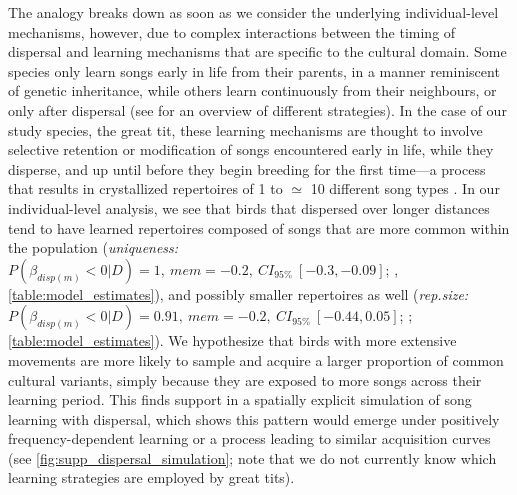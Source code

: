 \documentclass[9pt, onecolumn, twoside, lineno]{gsajnl}
\begin{document}
The analogy breaks down as soon as we consider the underlying individual-level mechanisms, however, due to complex interactions between the timing of dispersal and learning mechanisms that are specific to the cultural domain. Some species only learn songs early in life from their parents, in a manner reminiscent of genetic inheritance, while others learn continuously from their neighbours, or only after dispersal (see \autocite{searcy2021} for an overview of different strategies). In the case of our study species, the great tit, these learning mechanisms are thought to involve selective retention or modification of songs encountered early in life, while they disperse, and up until before they begin breeding for the first time---a process that results in crystallized repertoires of 1 to $\simeq$ 10 different song types \autocite{mcgregor1982b,rivera-gutierrez2011,merinorecalde2023a}. In our individual-level analysis, we see that birds that dispersed over longer distances tend to have learned repertoires composed of songs that are more common within the population (\textit{uniqueness:} $P(\beta_{disp (m)} < 0 | D) = 1,~mem = -0.2,~CI_{95\%}~[-0.3, -0.09]$; , \autoref{table:model_estimates}), and possibly smaller repertoires as well (\textit{rep.size:} $P(\beta_{disp (m)} < 0 | D) = 0.91,~mem = -0.2,~CI_{95\%}~[-0.44, 0.05]$; ; \autoref{table:model_estimates}). We hypothesize that birds with more extensive movements are more likely to sample and acquire a larger proportion of common cultural variants, simply because they are exposed to more songs across their learning period. This finds support in a spatially explicit simulation of song learning with dispersal, which shows this pattern would emerge under positively frequency-dependent learning or a process leading to similar acquisition curves (see \autoref{fig:supp_dispersal_simulation}; note that we do not currently know which learning strategies are employed by great tits).
\end{document}
